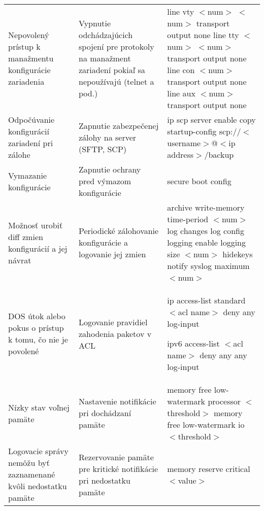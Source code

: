 \begin{longtable}[!htbp]{|L{10em}L{10em}L{34em}|}
	
	
	Nepovolený prístup k manažmentu konfigurácie zariadenia	&Vypnutie odchádzajúcich spojení pre protokoly na manažment zariadení pokiaľ sa nepoužívajú (telnet a pod.)	&line vty $<$num$>$ $<$num$>$
	transport output none
	line tty $<$num$>$ $<$num$>$
	transport output none
	line con $<$num$>$
	transport output none
	line aux $<$num$>$
	transport output none\\
	
	
	
	
	
	 Odpočúvanie konfigurácií zariadení pri zálohe	&Zapnutie zabezpečenej zálohy na server (SFTP, SCP)	&ip scp server enable
	copy startup-config scp://$<$username$>$@$<$ip address$>$/backup\\
	
	
	
	
	Vymazanie konfigurácie	&Zapnutie ochrany pred výmazom konfigurácie	&secure boot config\\
	
	
	
	 Možnosť urobiť diff zmien konfigurácií a jej návrat	&Periodické zálohovanie konfigurácie a logovanie jej zmien	&archive
	write-memory
	time-period $<$num$>$
	log changes
	log config
	logging enable
	logging size $<$num$>$
	hidekeys
	notify syslog
	maximum $<$num$>$\\
	
	
	
	
	DOS útok alebo pokus o prístup k tomu, čo nie je povolené	&Logovanie pravidiel zahodenia paketov v ACL	&ip access-list standard $<$acl name$>$
	deny any log-input
	
	ipv6 access-list $<$acl name$>$
	deny any any log-input\\
	
	
	
	
	 Nízky stav voľnej pamäte	&Nastavenie notifikácie pri dochádzaní pamäte	&memory free low-watermark processor $<$threshold$>$
	memory free low-watermark io $<$threshold$>$\\
	
	
	
	
	Logovacie správy nemôžu byť zaznamenané kvôli nedostatku pamäte	&Rezervovanie pamäte pre kritické notifikácie pri nedostatku pamäte	&memory reserve critical $<$value$>$ \\
	
	
	

\end{longtable}
